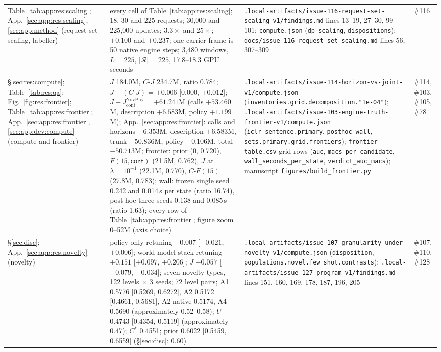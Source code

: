 {\begin{revblock}
\begin{longtable}{@{}>{\raggedright\arraybackslash}p{}>{\raggedright\arraybackslash}p{}>{\raggedright\arraybackslash}p{}>{\raggedright\arraybackslash}p{}@{}}
Table~\ref{tab:app:res:scaling}; App.~\ref{sec:app:res:scaling}, \ref{sec:app:method} (request-set scaling, labeller) & every cell of Table~\ref{tab:app:res:scaling}; 18, 30 and 225 requests; 30,000 and 225,000 updates; $3.3\times$ and $25\times$; $+0.100$ and $+0.237$; one carrier frame is 50 native engine steps; 3,480 windows, $L=225$, $|\mathcal{R}|=225$, 17.8--18.3 GPU seconds & \nolinkurl{.local-artifacts/issue-116-request-set-scaling-v1/findings.md} lines 13--19, 27--30, 99--101; \nolinkurl{compute.json} (\nolinkurl{dp_scaling}, \nolinkurl{dispositions}); \nolinkurl{docs/issue-116-request-set-scaling.md} lines 56, 307--309 & \#116 \\
\S\ref{sec:res:compute}; Table~\ref{tab:res:qa}; Fig.~\ref{fig:res:frontier}; Table~\ref{tab:app:res:frontier}; App.~\ref{sec:app:res:frontier}, \ref{sec:app:dev:compute} (compute and frontier) & $J$ 184.0M, $C\text{-}J$ 234.7M, ratio 0.784; $J-(C\text{-}J)=+0.006$ [0.000, $+0.012$]; $J-J_{\mathrm{cont}}^{\mathrm{NovPhy}}=+61.241$M (calls $+53.460$M, description $+6.583$M, policy $+1.199$M); App.~\ref{sec:app:res:frontier}: calls and horizons $-6.353$M, description $+6.583$M, trunk $-50.836$M, policy $-0.106$M, total $-50.713$M; frontier: prior (0, 0.720), $F(15,\textsf{cont})$ (21.5M, 0.762), $J$ at $\lambda=10^{-1}$ (22.1M, 0.770), $C\text{-}F(15)$ (27.8M, 0.783); wall: frozen single seed 0.242 and 0.014\,s per state (ratio 16.74), post-hoc three seeds 0.138 and 0.085\,s (ratio 1.63); every row of Table~\ref{tab:app:res:frontier}; figure zoom 0--52M (axis choice) & \nolinkurl{.local-artifacts/issue-114-horizon-vs-joint-v1/compute.json} (\nolinkurl{inventories.grid.decomposition."1e-04"}); \nolinkurl{.local-artifacts/issue-103-engine-truth-frontier-v1/compute.json} (\nolinkurl{iclr_sentence.primary}, \nolinkurl{posthoc_wall}, \nolinkurl{sets.primary.grid.frontiers}); \nolinkurl{frontier-table.csv} grid rows (\texttt{auc}, \texttt{macs\_per\_candidate}, \texttt{wall\_seconds\_per\_state}, \texttt{verdict\_auc\_macs}); manuscript \nolinkurl{figures/build_frontier.py} & \#114, \#103, \#105, \#78 \\
\S\ref{sec:disc}; App.~\ref{sec:app:res:novelty} (novelty) & policy-only retuning $-0.007$ [$-0.021$, $+0.006$]; world-model-stack retuning $+0.151$ [$+0.097$, $+0.206$]; $J$ $-0.057$ [$-0.079$, $-0.034$]; seven novelty types, 122 levels $\times$ 3 seeds; 72 level pairs; A1 0.5776 [0.5269, 0.6272], A2 0.5172 [0.4661, 0.5681], A2-native 0.5174, A4 0.5690 (approximately 0.52--0.58); $U$ 0.4743 [0.4354, 0.5119] (approximately 0.47); $C^{*}$ 0.4551; prior 0.6022 [0.5459, 0.6559] (\S\ref{sec:disc}: 0.60) & \nolinkurl{.local-artifacts/issue-107-granularity-under-novelty-v1/compute.json} (\nolinkurl{disposition}, \nolinkurl{populations.novel.few_shot.contrasts}); \nolinkurl{.local-artifacts/issue-127-program-v1/findings.md} lines 151, 160, 169, 178, 187, 196, 205 & \#107, \#110, \#128 \\

\end{longtable}
\end{revblock}}
